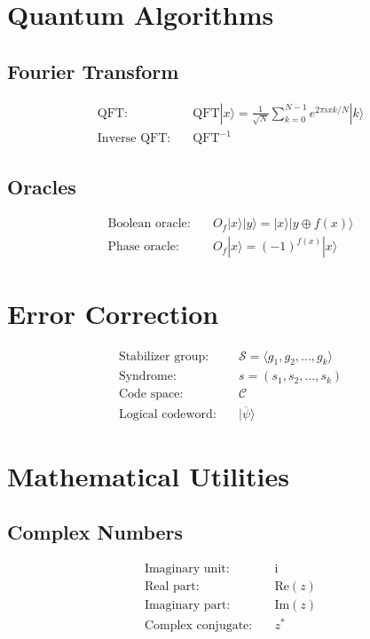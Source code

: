 \documentclass[12pt]{article}
\newcommand{\ket}[1]{|#1\rangle}
\newcommand{\QFT}{\text{QFT}}
\newcommand{\iQFT}{\text{QFT}^{-1}}
\newcommand{\oraclef}{O_f}
\newcommand{\stab}{\mathcal{S}}
\newcommand{\syndrome}{s}
\newcommand{\codespace}{\mathcal{C}}
\newcommand{\codeword}{\ket{\overline{\psi}}}
\newcommand{\ii}{\mathrm{i}}
\newcommand{\real}{\text{Re}}
\newcommand{\imag}{\text{Im}}
\newcommand{\conj}[1]{#1^*}
\theoremstyle{definition}
\theoremstyle{remark}
\begin{document}
\begin{multicols}{2}
\section{Quantum Algorithms}

\subsection{Fourier Transform}
\begin{align}
\text{QFT:} &\quad \QFT\ket{x} = \frac{1}{\sqrt{N}} \sum_{k=0}^{N-1} e^{2\pi i xk/N}\ket{k} \\
\text{Inverse QFT:} &\quad \iQFT
\end{align}

\subsection{Oracles}
\begin{align}
\text{Boolean oracle:} &\quad \oraclef\ket{x}\ket{y} = \ket{x}\ket{y \oplus f(x)} \\
\text{Phase oracle:} &\quad \oraclef\ket{x} = (-1)^{f(x)}\ket{x}
\end{align}

\section{Error Correction}

\begin{align}
\text{Stabilizer group:} &\quad \stab = \langle g_1, g_2, \ldots, g_k \rangle \\
\text{Syndrome:} &\quad \syndrome = (s_1, s_2, \ldots, s_k) \\
\text{Code space:} &\quad \codespace \\
\text{Logical codeword:} &\quad \codeword
\end{align}

\section{Mathematical Utilities}

\subsection{Complex Numbers}
\begin{align}
\text{Imaginary unit:} &\quad \ii \\
\text{Real part:} &\quad \real(z) \\
\text{Imaginary part:} &\quad \imag(z) \\
\text{Complex conjugate:} &\quad \conj{z}
\end{align}


\end{multicols}
\end{document}
